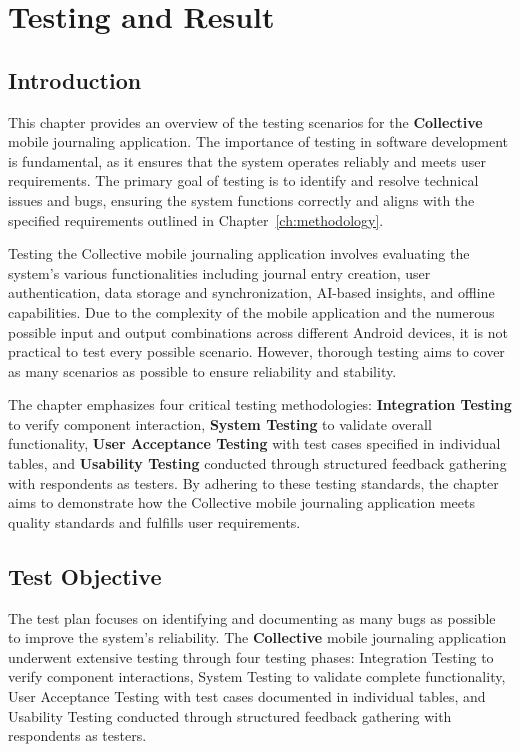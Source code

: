 \chapter{Testing and Result}\label{ch:testing}

\section{Introduction}\label{sec:testingIntroduction}

This chapter provides an overview of the testing scenarios for the \textbf{Collective} mobile journaling application. The importance of testing in software development is fundamental, as it ensures that the system operates reliably and meets user requirements. The primary goal of testing is to identify and resolve technical issues and bugs, ensuring the system functions correctly and aligns with the specified requirements outlined in Chapter~\ref{ch:methodology}.

Testing the Collective mobile journaling application involves evaluating the system's various functionalities including journal entry creation, user authentication, data storage and synchronization, AI-based insights, and offline capabilities. Due to the complexity of the mobile application and the numerous possible input and output combinations across different Android devices, it is not practical to test every possible scenario. However, thorough testing aims to cover as many scenarios as possible to ensure reliability and stability.

The chapter emphasizes four critical testing methodologies: \textbf{Integration Testing} to verify component interaction, \textbf{System Testing} to validate overall functionality, \textbf{User Acceptance Testing} with test cases specified in individual tables, and \textbf{Usability Testing} conducted through structured feedback gathering with respondents as testers. By adhering to these testing standards, the chapter aims to demonstrate how the Collective mobile journaling application meets quality standards and fulfills user requirements.

\section{Test Objective}\label{sec:testObjective}

The test plan focuses on identifying and documenting as many bugs as possible to improve the system's reliability. The \textbf{Collective} mobile journaling application underwent extensive testing through four testing phases: Integration Testing to verify component interactions, System Testing to validate complete functionality, User Acceptance Testing with test cases documented in individual tables, and Usability Testing conducted through structured feedback gathering with respondents as testers.

